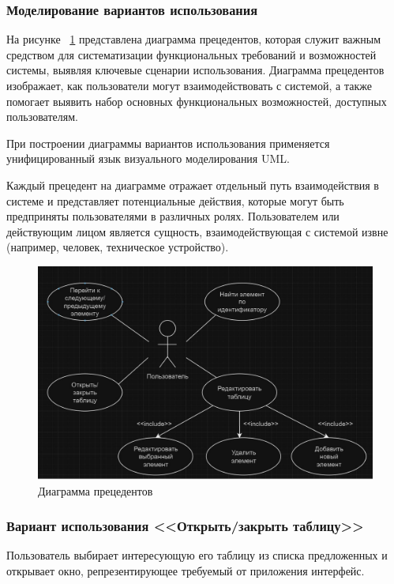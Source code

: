 \subsubsection{Моделирование вариантов использования}

На рисунке  ~\ref{fig:commonscheme2} представлена диаграмма прецедентов, которая служит важным средством для систематизации функциональных требований и возможностей системы, выявляя ключевые сценарии использования. Диаграмма прецедентов изображает, как пользователи могут взаимодействовать с системой, а также помогает выявить набор основных функциональных возможностей, доступных пользователям.

При построении диаграммы вариантов использования применяется унифицированный язык визуального моделирования UML.

Каждый прецедент на диаграмме отражает отдельный путь взаимодействия в системе и представляет потенциальные действия, которые могут быть предприняты пользователями в различных ролях. Пользователем или действующим лицом является сущность, взаимодействующая с системой извне (например, человек, техническое устройство).

\begin{figure}[ht]
	\centering
	\includegraphics[width=1\linewidth]{images/CommonScheme2}
	\caption{Диаграмма прецедентов}
	\label{fig:commonscheme2}
\end{figure}

\subsubsection{Вариант использования <<Открыть/закрыть таблицу>>}

Пользователь выбирает интересующую его таблицу из списка предложенных и открывает окно, репрезентирующее требуемый от приложения интерфейс.

